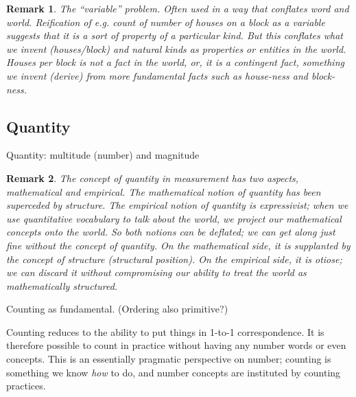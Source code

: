 \documentclass[11pt,twoside]{article}
\newtheorem{remark}{Remark}
\begin{document}
\begin{remark}
  The ``variable'' problem.  Often used in a way that conflates word
  and world.  Reification of e.g. count of number of houses on a block
  as a variable suggests that it is a sort of property of a particular
  kind.  But this conflates what we invent (houses/block) and natural
  kinds as properties or entities in the world.  Houses per block is
  not a fact in the world, or, it is a contingent fact, something we
  invent (derive) from more fundamental facts such as house-ness and
  block-ness.
\end{remark}

\subsection{Quantity}

Quantity:  multitude (number) and magnitude

\begin{remark}
  The concept of quantity in measurement has two aspects, mathematical
  and empirical.  The mathematical notion of quantity has been
  superceded by structure.  The empirical notion of quantity is
  expressivist; when we use quantitative vocabulary to talk about the
  world, we project our mathematical concepts onto the world.  So both
  notions can be deflated; we can get along just fine without the
  concept of quantity.  On the mathematical side, it is supplanted by
  the concept of structure (structural position).  On the empirical
  side, it is otiose; we can discard it without compromising our
  ability to treat the world as mathematically structured.
\end{remark}

Counting as fundamental.  (Ordering also primitive?)

Counting reduces to the ability to put things in 1-to-1
correspondence.  It is therefore possible to count in practice without
having any number words or even concepts.  This is an essentially
pragmatic perspective on number; counting is something we know
\textit{how} to do, and number concepts are instituted by counting
practices.
\end{document}
